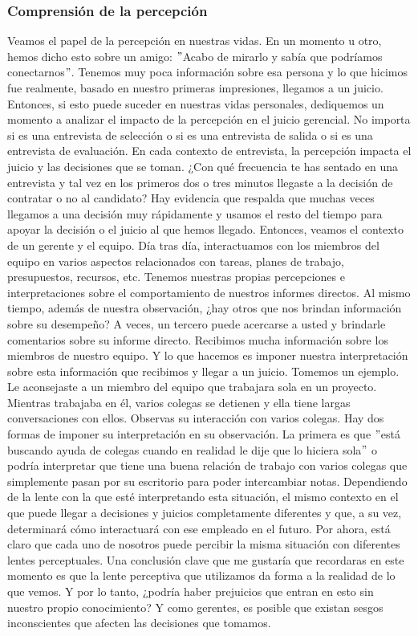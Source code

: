 \documentclass[10pt]{book}
\begin{document}
\subsubsection{Comprensión de la percepción}
Veamos el papel de la percepción en nuestras vidas. En un momento u otro, hemos dicho esto sobre un amigo: $"$Acabo de mirarlo y sabía que podríamos conectarnos$"$. Tenemos muy poca información sobre esa persona y lo que hicimos fue realmente, basado en nuestro primeras impresiones, llegamos a un juicio. Entonces, si esto puede suceder en nuestras vidas personales, dediquemos un momento a analizar el impacto de la percepción en el juicio gerencial. No importa si es una entrevista de selección o si es una entrevista de salida o si es una entrevista de evaluación. En cada contexto de entrevista, la percepción impacta el juicio y las decisiones que se toman. ¿Con qué frecuencia te has sentado en una entrevista y tal vez en los primeros dos o tres minutos llegaste a la decisión de contratar o no al candidato? Hay evidencia que respalda que muchas veces llegamos a una decisión muy rápidamente y usamos el resto del tiempo para apoyar la decisión o el juicio al que hemos llegado. Entonces, veamos el contexto de un gerente y el equipo. Día tras día, interactuamos con los miembros del equipo en varios aspectos relacionados con tareas, planes de trabajo, presupuestos, recursos, etc. Tenemos nuestras propias percepciones e interpretaciones sobre el comportamiento de nuestros informes directos. Al mismo tiempo, además de nuestra observación, ¿hay otros que nos brindan información sobre su desempeño? A veces, un tercero puede acercarse a usted y brindarle comentarios sobre su informe directo. Recibimos mucha información sobre los miembros de nuestro equipo. Y lo que hacemos es imponer nuestra interpretación sobre esta información que recibimos y llegar a un juicio. Tomemos un ejemplo. Le aconsejaste a un miembro del equipo que trabajara sola en un proyecto. Mientras trabajaba en él, varios colegas se detienen y ella tiene largas conversaciones con ellos. Observas su interacción con varios colegas. Hay dos formas de imponer su interpretación en su observación. La primera es que $"$está buscando ayuda de colegas cuando en realidad le dije que lo hiciera sola$"$ o podría interpretar que tiene una buena relación de trabajo con varios colegas que simplemente pasan por su escritorio para poder intercambiar notas. Dependiendo de la lente con la que esté interpretando esta situación, el mismo contexto en el que puede llegar a decisiones y juicios completamente diferentes y que, a su vez, determinará cómo interactuará con ese empleado en el futuro. Por ahora, está claro que cada uno de nosotros puede percibir la misma situación con diferentes lentes perceptuales. Una conclusión clave que me gustaría que recordaras en este momento es que la lente perceptiva que utilizamos da forma a la realidad de lo que vemos. Y por lo tanto, ¿podría haber prejuicios que entran en esto sin nuestro propio conocimiento? Y como gerentes, es posible que existan sesgos inconscientes que afecten las decisiones que tomamos.
\end{document}
